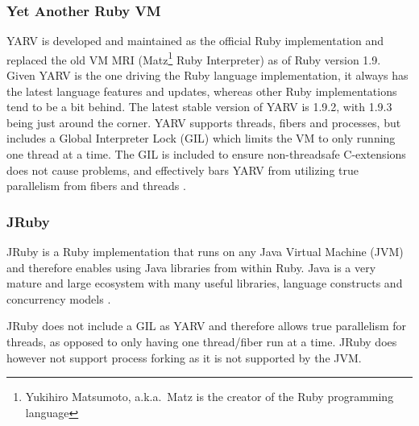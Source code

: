\subsubsection{Yet Another Ruby VM}
YARV is developed and maintained as the official Ruby implementation and replaced
the old VM MRI (Matz\footnote{Yukihiro Matsumoto, a.k.a.\ Matz is the creator of 
the Ruby programming language} Ruby Interpreter) as of Ruby version 1.9. Given
YARV is the one driving the Ruby language implementation, it always has the
latest language features and updates, whereas other Ruby implementations tend
to be a bit behind. The latest stable version of YARV is 1.9.2, with 1.9.3
being just around the corner. YARV supports threads, fibers and processes, but
includes a Global Interpreter Lock (GIL) which limits the VM to only running
one thread at a time. The GIL is included to ensure non-threadsafe
C-extensions does not cause problems, and effectively bars YARV from
utilizing true parallelism from fibers and threads \cite{ruby19}.

\subsubsection{JRuby}
JRuby is a Ruby implementation that runs on any Java Virtual Machine (JVM)
and therefore enables using Java libraries from within Ruby. Java is a very
mature and large ecosystem with many useful libraries, language constructs and
concurrency models \cite{usejruby}.

JRuby does not include a GIL as YARV and therefore allows true
parallelism for threads, as opposed to only having one thread/fiber run
at a time. JRuby does however not support process forking as it is not
supported by the JVM\@ \cite{jruby}.
